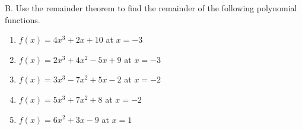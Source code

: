 B. Use the remainder theorem  to find the remainder of the following polynomial functions. 

\begin{enumerate}[label = \arabic*. ]
\item \hspce \hspce $f(x) = 4x^3+2x+10$ at $x = -3$ 
\vspce
\item \hspce \hspce $f(x) = 2x^3+4x^2-5x+9$ at $x = -3$ 
\vspce
\item \hspce \hspce $f(x) = 3x^3-7x^2+5x-2$ at $x = -2$ 
\vspce
\item \hspce \hspce $f(x) = 5x^3+7x^2+8$ at $x = -2$ 
\vspce
\item \hspce \hspce $f(x) = 6x^2+3x-9$ at $x = 1$ 


\end{enumerate} 
 

